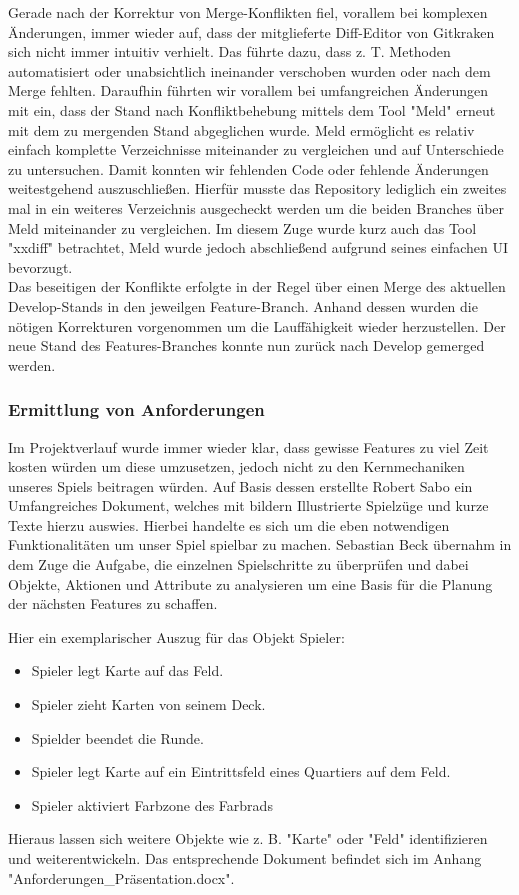 Gerade nach der Korrektur von Merge-Konflikten fiel, vorallem bei komplexen Änderungen, immer wieder auf, dass der mitglieferte Diff-Editor von Gitkraken sich nicht immer intuitiv verhielt. Das führte dazu, dass z. T. Methoden automatisiert oder unabsichtlich ineinander verschoben wurden oder nach dem Merge fehlten. Daraufhin führten wir vorallem bei umfangreichen Änderungen mit ein, dass der Stand nach Konfliktbehebung mittels dem Tool "Meld" \cite{Meld} erneut mit dem zu mergenden Stand abgeglichen wurde. Meld ermöglicht es relativ einfach komplette Verzeichnisse miteinander zu vergleichen und auf Unterschiede zu untersuchen. Damit konnten wir fehlenden Code oder fehlende Änderungen weitestgehend auszuschließen. Hierfür musste das Repository lediglich ein zweites mal in ein weiteres Verzeichnis ausgecheckt werden um die beiden Branches über Meld miteinander zu vergleichen. Im diesem Zuge wurde kurz auch das Tool "xxdiff" betrachtet, Meld wurde jedoch abschließend aufgrund seines einfachen UI bevorzugt. \\
Das beseitigen der Konflikte erfolgte in der Regel über einen Merge des aktuellen Develop-Stands in den jeweilgen Feature-Branch. Anhand dessen wurden die nötigen Korrekturen vorgenommen um die Lauffähigkeit wieder herzustellen. Der neue Stand des Features-Branches konnte nun zurück nach Develop gemerged werden. 

\subsubsection{Ermittlung von Anforderungen}
Im Projektverlauf wurde immer wieder klar, dass gewisse Features zu viel Zeit kosten würden um diese umzusetzen, jedoch nicht zu den Kernmechaniken unseres Spiels beitragen würden.
Auf Basis dessen erstellte Robert Sabo ein Umfangreiches Dokument, welches mit bildern Illustrierte Spielzüge und kurze Texte hierzu auswies. Hierbei handelte es sich um die eben notwendigen Funktionalitäten um unser Spiel spielbar zu machen. Sebastian Beck übernahm in dem Zuge die Aufgabe, die einzelnen Spielschritte zu überprüfen und dabei Objekte, Aktionen und Attribute zu analysieren um eine Basis für die Planung der nächsten Features zu schaffen.

Hier ein exemplarischer Auszug für das Objekt Spieler:
\begin{itemize}
\item Spieler legt Karte auf das Feld.
\item Spieler zieht Karten von seinem Deck.
\item Spielder beendet die Runde.
\item Spieler legt Karte auf ein Eintrittsfeld eines Quartiers auf dem Feld.
\item Spieler aktiviert Farbzone des Farbrads
\end{itemize}

Hieraus lassen sich weitere Objekte wie z. B. "Karte" oder "Feld" identifizieren und weiterentwickeln. Das entsprechende Dokument befindet sich im Anhang "Anforderungen\_Präsentation.docx".
